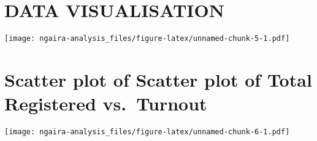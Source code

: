 \documentclass[
]{article}
\begin{document}
\hypertarget{data-visualisation}{%
\section{DATA VISUALISATION}\label{data-visualisation}}

\texttt{[image: ngaira-analysis\_files/figure-latex/unnamed-chunk-5-1.pdf]}

\hypertarget{scatter-plot-of-scatter-plot-of-total-registered-vs.-turnout}{%
\section{Scatter plot of Scatter plot of Total Registered
vs.~Turnout}\label{scatter-plot-of-scatter-plot-of-total-registered-vs.-turnout}}

\texttt{[image: ngaira-analysis\_files/figure-latex/unnamed-chunk-6-1.pdf]}
\end{document}
